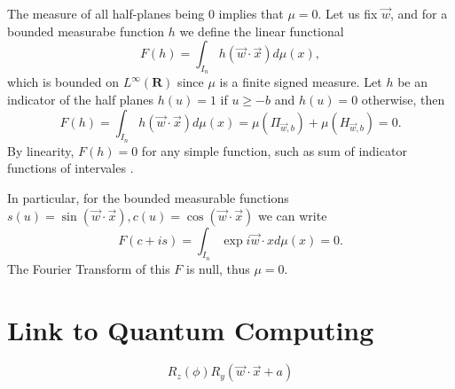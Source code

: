 \documentclass[aps,amssymb,amsmath,amsfonts,pra,superscriptaddress,twocolumn]{revtex4}
\begin{document}
The measure of all half-planes being 0 implies that $\mu = 0$. Let us fix $\vec w$, and for a bounded measurabe function $h$ we define the linear functional
\begin{equation}
F(h) = \int_{I_n} h(\vec w \cdot \vec x) d\mu(x),
\end{equation}
which is bounded on $L^\infty(\mathbf{R})$ since $\mu$ is a finite signed measure. Let $h$ be an indicator of the half planes $h(u) = 1$ if $u\geq -b$ and $h(u) = 0$ otherwise, then
\begin{equation}
F(h) = \int_{I_n} h(\vec w \cdot \vec x) d\mu(x) =  \mu(\Pi_{\vec w, b}) + \mu(H_{\vec w, b}) = 0.
\end{equation}
By linearity, $F(h) = 0$ for any simple function, such as sum of indicator functions of intervales \cite{analysis-ash1972}. 

In particular, for the bounded measurable functions $s(u) = \sin(\vec w \cdot \vec x), c(u) = \cos(\vec w \cdot \vec x)$ we can write
\begin{equation}
F(c + is) = \int_{I_n} \exp{i \vec w \cdot x} d\mu(x) = 0.
\end{equation}
The Fourier Transform of this $F$ is null, thus $\mu = 0$.

\section{Link to Quantum Computing}
$$
R_z(\phi) R_y(\vec w \cdot \vec x + a)
$$


\end{document}

